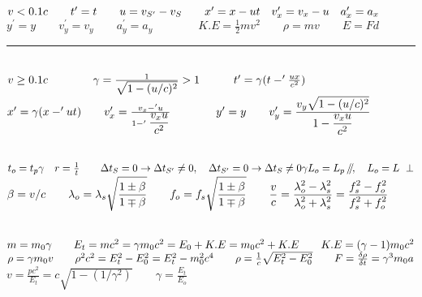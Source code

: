 \documentclass[a4paper,12pt]{article}
\newcommand{\slparallel}{\mathbin{\!/\mkern-5mu/\!}}
\begin{document}

\fontsize{14.5}{16}\selectfont

\noindent
$v < 0.1c \qquad t^\prime = t \qquad u = v_{S^\prime} - v_S \qquad x^\prime = x - ut \quad v^\prime_x = v_x - u \quad a_x^\prime = a_x \\[+2mm]$
$ y^\prime = y \qquad v^\prime_y = v_y \qquad a_y^\prime = a_y \qquad \qquad K.E = \frac{1}{2} mv^2 \qquad \rho = mv \qquad E = F d $

{\centering \rule{10cm}{0.4pt} \par}

\ \\
\noindent
$ v \ge 0.1c \qquad \qquad \gamma = \frac{1}{\displaystyle \sqrt{1- (u/c)^2}} > 1 \qquad \quad t^\prime = \gamma (t -^\prime \frac{ux}{c^2})\\$
$x^\prime = \gamma(x -^\prime ut) \qquad v^\prime_x = \frac{v_x -^\prime u}{1-^\prime \displaystyle \frac{v_x u}{c^2} } \qquad \qquad  y^\prime = y \qquad v^\prime_y = \displaystyle \frac{\displaystyle v_y \sqrt{1-(u/c)^2}}{\displaystyle 1- \frac{v_x u}{c^2}}\\[-3mm]$

{\centering \hdashrule{10cm}{0.4pt}{4pt} \par}

\ \\
\noindent
$ t_o = t_p \gamma \quad r = \frac{1}{t} \qquad \Delta t_S = 0 \rightarrow \Delta t_{S^\prime} \neq 0, \quad \Delta t_{S^\prime} = 0 \rightarrow \Delta t_S \neq 0 \\ \gamma L_o = L_p \ \slparallel, \quad L_o = L \ \perp \\[+2mm]$
$ \beta = v/c \qquad \lambda_o = \lambda_s \displaystyle \sqrt{\frac{1\pm \beta}{1\mp \beta}} \qquad f_o = f_s \displaystyle \sqrt{\frac{1\pm \beta}{1\mp \beta}} \qquad \frac{v}{c} = \frac{\displaystyle \lambda_o^2 - \lambda_s^2}{\displaystyle \lambda_o^2 + \lambda_s^2} = \frac{\displaystyle f_s^2 - f_o^2}{\displaystyle f_s^2 + f_o^2} \\[-1mm]$

{\centering \hdashrule{10cm}{0.4pt}{4pt} \par}

\ \\
\noindent
$ m = m_0 \gamma \qquad E_t = mc^2 = \gamma m_0c^2 = E_0 + K.E = m_0c^2 + K.E \qquad K.E = (\gamma - 1) m_0c^2 \\[+2mm]$
$\rho = \gamma m_0v \qquad \rho^2c^2 = E_t^2 - E_0^2 = E_t^2 - m_0^2c^4 \qquad \rho = \frac{1}{c} \sqrt{E_t^2 - E_0^2} \qquad F = \frac{\delta \rho}{\delta t} = \gamma^3 m_0 a\\[+2mm]$
$v = \frac{p c^2}{E_t} = c \sqrt{1- (1/\gamma^2)} \qquad \gamma = \frac{E_t}{E_o}$
\end{document}

